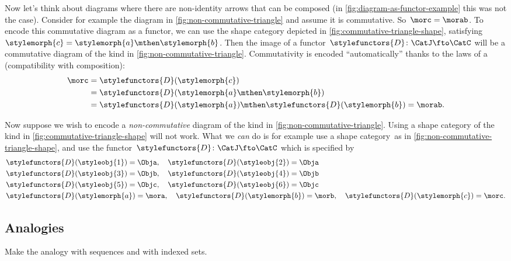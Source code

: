 Now let's think about diagrams where there are non-identity arrows that can be composed (in \cref{fig:diagram-as-functor-example} this was not the case).
Consider for example the diagram in \cref{fig:non-commutative-triangle} and assume it is commutative.
So~$\morc = \morab$.
To encode this commutative diagram as a functor, we can use the shape category depicted in \cref{fig:commutative-triangle-shape}, satisfying~$\stylemorph{c} = \stylemorph{a} \mthen \stylemorph{b}$.
Then the image of a functor~$\stylefunctors{D}\colon \CatJ \fto \CatC$ will be a commutative diagram of the kind in \cref{fig:non-commutative-triangle}.
Commutativity is encoded ``automatically'' thanks to the laws of a  (compatibility with composition):
\begin{align}
    \morc & = \stylefunctors{D}(\stylemorph{c}) \\
          & = \stylefunctors{D}(\stylemorph{a} \mthen \stylemorph{b}) \\
          & = \stylefunctors{D}(\stylemorph{a}) \mthen \stylefunctors{D}(\stylemorph{b}) = \morab.
\end{align}

\begin{marginfigure}
    \centering
    \caption{}
    \label{fig:non-commutative-triangle-shape}
\end{marginfigure}

Now suppose we wish to encode a \emph{non-commutative} diagram of the kind in \cref{fig:non-commutative-triangle}.
Using a shape category of the kind in \cref{fig:commutative-triangle-shape} will not work.
What we \emph{can} do is for example use a shape category~\CatJ as in \cref{fig:non-commutative-triangle-shape}, and use the functor~$\stylefunctors{D}\colon \CatJ \fto \CatC$ which is specified by
\begin{align}
     & \stylefunctors{D}(\styleobj{1}) = \Obja, \quad \stylefunctors{D}(\styleobj{2}) = \Obja \\
     & \stylefunctors{D}(\styleobj{3}) = \Objb, \quad \stylefunctors{D}(\styleobj{4}) = \Objb \\
     & \stylefunctors{D}(\styleobj{5}) = \Objc, \quad \stylefunctors{D}(\styleobj{6}) = \Objc \\
     & \stylefunctors{D}(\stylemorph{a}) = \mora, \quad \stylefunctors{D}(\stylemorph{b}) = \morb, \quad \stylefunctors{D}(\stylemorph{c}) = \morc.
\end{align}

\subsection{Analogies}

Make the analogy with sequences and with indexed sets.

\XXX


